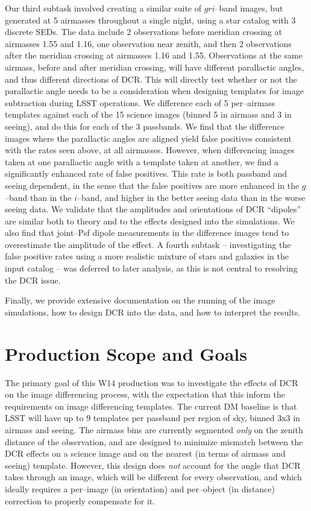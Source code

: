 \documentclass[prd, nofootinbib, floatfix, 11pt, tightenlines, times]{article}
\begin{document}
Our third subtask involved creating a similar suite of $gri$--band
images, but generated at 5 airmasses throughout a single night, using
a star catalog with 3 discrete SEDs.  The data include 2 observations
before meridian crossing at airmasses 1.55 and 1.16, one observation
near zenith, and then 2 observations after the meridian crossing at
airmasses 1.16 and 1.55.  Observations at the same airmass, before and
after meridian crossing, will have different parallactic angles, and
thus different directions of DCR.  This will directly test whether or
not the parallactic angle needs to be a consideration when designing
templates for image subtraction during LSST operations.  We difference
each of 5 per--airmass templates against each of the 15 science images
(binned 5 in airmass and 3 in seeing), and do this for each of the 3
passbands.  We find that the difference images where the parallactic
angles are aligned yield false positives consistent with the rates
seen above, at all airmasses.  However, when differencing images taken
at one parallactic angle with a template taken at another, we find a
significantly enhanced rate of false positives.  This rate is both
passband and seeing dependent, in the sense that the false positives
are more enhanced in the $g$--band than in the $i$--band, and higher
in the better seeing data than in the worse seeing data.  We validate
that the amplitudes and orientations of DCR ``dipoles'' are similar
both to theory and to the effects designed into the simulations.  We
also find that joint--Psf dipole measurements in the difference images
tend to overestimate the amplitude of the effect.  A fourth subtask --
investigating the false positive rates using a more realistic mixture
of stars and galaxies in the input catalog -- was deferred to later
analysis, as this is not central to resolving the DCR issue.

Finally, we provide extensive documentation on the running of the
image simulations, how to design DCR into the data, and how to
interpret the results.  

\clearpage
\tableofcontents
\clearpage

\section{Production Scope and Goals}

The primary goal of this W14 production was to investigate the effects
of DCR on the image differencing process, with the expectation that
this inform the requirements on image differencing templates.  The
current DM baseline is that LSST will have up to 9 templates per
passband per region of sky, binned 3x3 in airmass and seeing.  The
airmass bins are currently segmented {\it only} on the zenith distance
of the observation, and are designed to minimize mismatch between the
DCR effects on a science image and on the nearest (in terms of airmass
and seeing) template.  However, this design does {\it not} account for
the angle that DCR takes through an image, which will be different for
every observation, and which ideally requires a per--image (in
orientation) and per--object (in distance) correction to properly
compensate for it.
\end{document}
